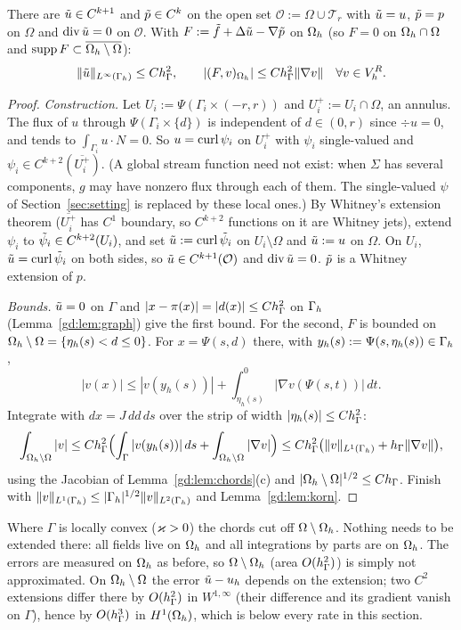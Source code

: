 \begin{lemma}\label{gd:lem:ext}
There are $\tilde u\in C^{k+1}$ and $\tilde p\in C^{k}$ on the open set $\mathcal O:=\Omega\cup\mathcal T_r$ with $\tilde u=u$, $\tilde p=p$ on $\Omega$ and $\operatorname{div}\tilde u=0$ on $\mathcal O$. With $F:=\tilde f+\Delta\tilde u-\nabla\tilde p$ on $\Omega_h$ (so $F=0$ on $\Omega_h\cap\Omega$ and $\operatorname{supp}F\subset\overline{\Omega_h\setminus\Omega}$):
\[
\lVert \tilde u\rVert_{L^\infty(\Gamma_h)}\le Ch_\Gamma^2,\qquad|(F,v)_{\Omega_h}|\le Ch_\Gamma^2\lVert \nabla v\rVert\quad\forall v\in V_h^R .
\]
\end{lemma}

\begin{proof}
\emph{Construction.} Let $U_i:=\Psi(\Gamma_i\times(-r,r))$ and $U_i^+:=U_i\cap\Omega$, an annulus. The flux of $u$ through $\Psi(\Gamma_i\times\{d\})$ is independent of $d\in(0,r)$ since $\div u=0$, and tends to $\int_{\Gamma_i}u\cdot N=0$. So $u=\operatorname{curl}\psi_i$ on $U_i^+$ with $\psi_i$ single-valued and $\psi_i\in C^{k+2}(\overline{U_i^+})$. (A global stream function need not exist: when $\Sigma$ has several components, $g$ may have nonzero flux through each of them. The single-valued $\psi$ of Section~\ref{sec:setting} is replaced by these local ones.) By Whitney's extension theorem ($\overline{U_i^+}$ has $C^1$ boundary, so $C^{k+2}$ functions on it are Whitney jets), extend $\psi_i$ to $\tilde\psi_i\in C^{k+2}(U_i)$, and set $\tilde u:=\operatorname{curl}\tilde\psi_i$ on $U_i\setminus\Omega$ and $\tilde u:=u$ on $\Omega$. On $U_i$, $\tilde u=\operatorname{curl}\tilde\psi_i$ on both sides, so $\tilde u\in C^{k+1}(\mathcal O)$ and $\operatorname{div}\tilde u=0$. $\tilde p$ is a Whitney extension of $p$.

\emph{Bounds.} $\tilde u=0$ on $\Gamma$ and $|x-\pi(x)|=|d(x)|\le Ch_\Gamma^2$ on $\Gamma_h$ (Lemma~\ref{gd:lem:graph}) give the first bound. For the second, $F$ is bounded on $\Omega_h\setminus\Omega=\{\eta_h(s)<d\le0\}$. For $x=\Psi(s,d)$ there, with $y_h(s):=\Psi(s,\eta_h(s))\in\Gamma_h$,
\[
|v(x)|\le|v(y_h(s))|+\int_{\eta_h(s)}^0|\nabla v(\Psi(s,t))|\,dt .
\]
Integrate with $dx=J\,dd\,ds$ over the strip of width $|\eta_h(s)|\le Ch_\Gamma^2$:
\[
\int_{\Omega_h\setminus\Omega}|v|\le Ch_\Gamma^2\Bigl(\int_\Gamma|v(y_h(s))|\,ds+\int_{\Omega_h\setminus\Omega}|\nabla v|\Bigr)\le Ch_\Gamma^2\bigl(\lVert v\rVert_{L^1(\Gamma_h)}+h_\Gamma\lVert \nabla v\rVert\bigr),
\]
using the Jacobian of Lemma~\ref{gd:lem:chords}(c) and $|\Omega_h\setminus\Omega|^{1/2}\le Ch_\Gamma$. Finish with $\lVert v\rVert_{L^1(\Gamma_h)}\le|\Gamma_h|^{1/2}\lVert v\rVert_{L^2(\Gamma_h)}$ and Lemma~\ref{gd:lem:korn}.
\end{proof}

\begin{remark}\label{gd:rem:outside}
Where $\Gamma$ is locally convex ($\varkappa>0$) the chords cut off $\Omega\setminus\Omega_h$. Nothing needs to be extended there: all fields live on $\Omega_h$ and all integrations by parts are on $\Omega_h$. The errors are measured on $\Omega_h$ as before, so $\Omega\setminus\Omega_h$ (area $O(h_\Gamma^2)$) is simply not approximated. On $\Omega_h\setminus\Omega$ the error $\tilde u-u_h$ depends on the extension; two $C^2$ extensions differ there by $O(h_\Gamma^2)$ in $W^{1,\infty}$ (their difference and its gradient vanish on $\Gamma$), hence by $O(h_\Gamma^3)$ in $H^1(\Omega_h)$, which is below every rate in this section.
\end{remark}

